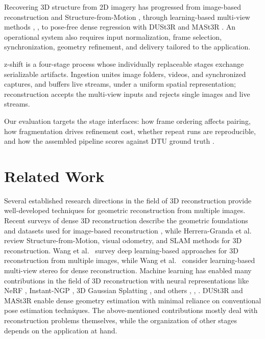 \documentclass[conference]{IEEEtran}
\begin{document}
Recovering 3D structure from 2D imagery has progressed from image-based
reconstruction \cite{b2} and Structure-from-Motion \cite{b3}, through
learning-based multi-view methods \cite{b4}, \cite{b5}, to pose-free dense
regression with DUSt3R \cite{b6} and MASt3R \cite{b7}. An operational system
also requires input normalization, frame selection, synchronization, geometry
refinement, and delivery tailored to the application.

z-shift is a four-stage process whose individually replaceable stages exchange
serializable artifacts. Ingestion unites image folders, videos, and synchronized
captures, and buffers live streams, under a uniform spatial representation;
reconstruction accepts the multi-view inputs and rejects single images and live
streams.

Our evaluation targets the stage interfaces: how frame ordering affects pairing,
how fragmentation drives refinement cost, whether repeat runs are reproducible,
and how the assembled pipeline scores against DTU ground truth \cite{b19}.

\section{Related Work}

Several established research directions in the field of 3D reconstruction
provide well-developed techniques for geometric reconstruction from multiple
images. Recent surveys of dense 3D reconstruction describe the geometric
foundations and datasets used for image-based reconstruction \cite{b2}, while
Herrera-Granda et al.\ \cite{b3} review Structure-from-Motion, visual odometry,
and SLAM methods for 3D reconstruction. Wang et al.\ \cite{b4} survey deep
learning-based approaches for 3D reconstruction from multiple images, while
Wang et al.\ \cite{b5} consider learning-based multi-view stereo for dense
reconstruction. Machine learning has enabled many contributions in the field of
3D reconstruction with neural representations like NeRF \cite{b16},
Instant-NGP \cite{b20}, 3D Gaussian Splatting \cite{b21}, and others
\cite{b13}, \cite{b14}, \cite{b22}. DUSt3R \cite{b6} and MASt3R \cite{b7}
enable dense geometry estimation with minimal reliance on conventional pose
estimation techniques. The above-mentioned contributions mostly deal with
reconstruction problems themselves, while the organization of other stages
depends on the application at hand.
\end{document}
